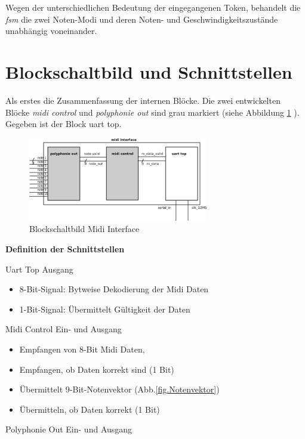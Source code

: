 Wegen der unterschiedlichen Bedeutung der eingegangenen Token, behandelt die \textit{fsm} die zwei Noten-Modi und deren Noten- und Geschwindigkeitszustände unabhängig voneinander.


\section{Blockschaltbild und Schnittstellen}

Als erstes die Zusammenfassung der internen Blöcke. Die zwei entwickelten Blöcke \textit{midi control} und \textit{polyphonie out} sind grau markiert (siehe Abbildung \ref{fig.midi_interface_block} ). Gegeben ist der Block uart top.

\begin{figure}[H]
	\includegraphics[width=0.7\textwidth]{images/midi_interface/midi_interface_block.png}
	\caption{Blockschaltbild Midi Interface}
	\label{fig.midi_interface_block}
\end{figure}

\textbf{Definition der Schnittstellen}\label{schnittstellen}

Uart Top Ausgang

\begin{itemize}
	\item 8-Bit-Signal: Bytweise Dekodierung der Midi Daten 
	\item 1-Bit-Signal: Übermittelt Gültigkeit der Daten
\end{itemize}

Midi Control Ein- und Ausgang

\begin{itemize}
	\item Empfangen von 8-Bit Midi Daten,
    \item Empfangen, ob Daten korrekt sind (1 Bit)
	\item Übermittelt 9-Bit-Notenvektor (Abb.\ref{fig.Notenvektor})
    \item Übermitteln, ob Daten korrekt (1 Bit)
\end{itemize}

Polyphonie Out Ein- und Ausgang

